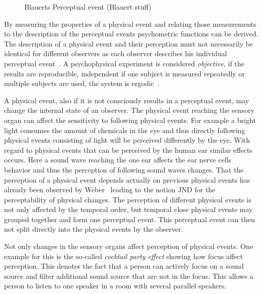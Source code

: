 \begin{figure}
	\caption{Blauerts Perceptual event (Blauert stuff)}
	\label{img:chap02:auditory-event}
\end{figure}

By measuring the properties of a physical event and relating those measurements to the description of the perceptual events psychometric functions can be derived.
The description of a physical event and their perception must not necessarily be identical for different observers as each observer describes his individual perceptual event~\cite[p. 11]{blauert_spatial_1996}.
A psychophysical experiment is considered \emph{objective}, if the results are reproducible, independent if one subject is measured repeatedly or multiple subjects are used, \ie the system is ergodic~\cite[p. 11]{blauert_spatial_1996}.

A physical event, also if it is not consciously results in a perceptual event, may change the internal state of an observer.
The physical event reaching the sensory organ can affect the sensitivity to following physical events.
For example a bright light consumes the amount of chemicals in the eye and thus directly following physical events consisting of light will be perceived differently by the eye.
With regard to physical events that can be perceived by the human ear similar effects occurs.
Here a sound wave reaching the one ear affects the ear nerve cells behavior and thus the perception of following sound waves changes. %
That the perception of a physical event depends actually on previous physical events has already been observed by Weber~\cite{Weber-Fechner} leading to the notion \ac{JND} for the perceptability of physical changes.
The perception of different physical events is not only affected by the temporal order, but temporal close physical events may grouped together and form one perceptual event.%
This perceptual event can then not split directly into the physical events by the observer.

Not only changes in the sensory organs affect perception of physical events.
One example for this is the so-called \emph{cocktail party effect} showing how focus affect perception.
This denotes the fact that a person can actively focus on a sound source and filter additional sound source that are not in the focus.
This allows a person to listen to one speaker in a room with several parallel speakers.


